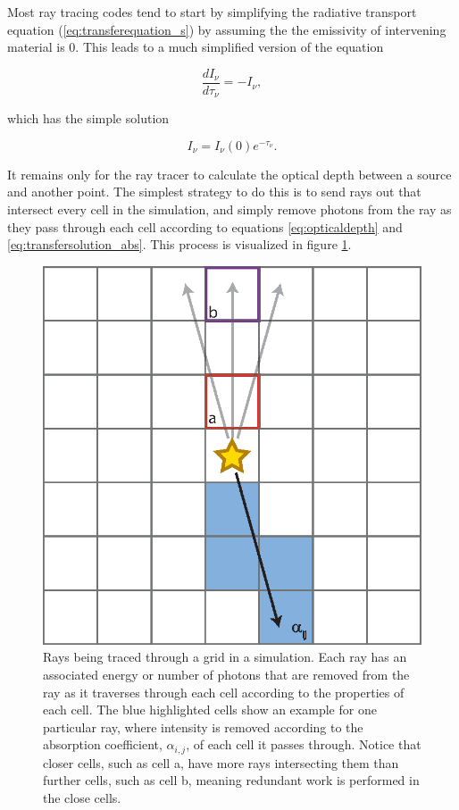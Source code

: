 Most ray tracing codes tend to start by simplifying the radiative transport equation (\ref{eq:transferequation_s}) by assuming the the emissivity of intervening material is 0. This leads to a much simplified version of the equation

\begin{equation}
\label{eq:transferequation_abs}
\frac{dI_{\nu}}{d\tau_{\nu}} = -I_{\nu},
\end{equation}

which has the simple solution

\begin{equation}
\label{eq:transfersolution_abs}
I_{\nu} = I_{\nu}(0)e^{-\tau_{\nu}}.
\end{equation}

It remains only for the ray tracer to calculate the optical depth between a source and another point. The simplest strategy to do this is to send rays out that intersect every cell in the simulation, and simply remove photons from the ray as they pass through each cell according to equations \ref{eq:opticaldepth} and \ref{eq:transfersolution_abs}. This process is visualized in figure \ref{fig:raytracing}.

\begin{figure}
\includegraphics[width=\textwidth]{graphics/ray_flux.eps}
\caption[A visualization of ray tracing.]{Rays being traced through a grid in a simulation. Each ray has an associated energy or number of photons that are removed from the ray as it traverses through each cell according to the properties of each cell. The blue highlighted cells show an example for one particular ray, where intensity is removed according to the absorption coefficient, $\alpha_{i,j}$, of each cell it passes through. Notice that closer cells, such as cell a, have more rays intersecting them than further cells, such as cell b, meaning redundant work is performed in the close cells.}
\label{fig:raytracing}
\end{figure}

